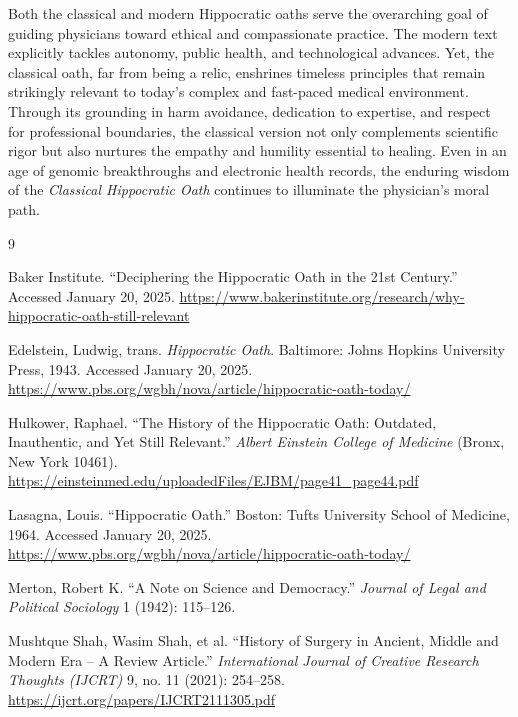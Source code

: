 \documentclass[12pt]{article}
\begin{document}
\bigskip

Both the classical and modern Hippocratic oaths serve the overarching goal of guiding physicians toward ethical and compassionate practice. 
The modern text explicitly tackles autonomy, public health, and technological advances. 
Yet, the classical oath, far from being a relic, enshrines timeless principles that remain strikingly relevant 
to today’s complex and fast-paced medical environment. 
Through its grounding in harm avoidance, dedication to expertise, and respect for professional boundaries, 
the classical version not only complements scientific rigor but also nurtures the empathy and humility essential to healing. 
Even in an age of genomic breakthroughs and electronic health records, 
the enduring wisdom of the \textit{Classical Hippocratic Oath} continues to illuminate the physician’s moral path.

\newpage
\begin{thebibliography}{9}

Baker Institute. ``Deciphering the Hippocratic Oath in the 21st Century.'' Accessed January 20, 2025. 
\url{https://www.bakerinstitute.org/research/why-hippocratic-oath-still-relevant}

Edelstein, Ludwig, trans. \textit{Hippocratic Oath}. Baltimore: Johns Hopkins University Press, 1943. 
Accessed January 20, 2025. 
\url{https://www.pbs.org/wgbh/nova/article/hippocratic-oath-today/}

Hulkower, Raphael. ``The History of the Hippocratic Oath: Outdated, Inauthentic, and Yet Still Relevant.'' 
\textit{Albert Einstein College of Medicine} (Bronx, New York 10461).  
\url{https://einsteinmed.edu/uploadedFiles/EJBM/page41_page44.pdf} 

Lasagna, Louis. ``Hippocratic Oath.'' Boston: Tufts University School of Medicine, 1964. 
Accessed January 20, 2025. 
\url{https://www.pbs.org/wgbh/nova/article/hippocratic-oath-today/}

Merton, Robert K. ``A Note on Science and Democracy.'' \textit{Journal of Legal and Political Sociology} 1 (1942): 115--126.

Mushtque Shah, Wasim Shah, et al. ``History of Surgery in Ancient, Middle and Modern Era -- A Review Article.'' 
\textit{International Journal of Creative Research Thoughts (IJCRT)} 9, no. 11 (2021): 254--258. 
\url{https://ijcrt.org/papers/IJCRT2111305.pdf}

\end{thebibliography}
\end{document}
